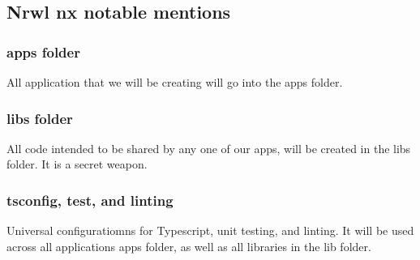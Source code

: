 \subsection{Nrwl nx notable mentions}

\subsubsection{apps folder}
All application that we will be creating will go into the apps folder.

\subsubsection{libs folder}
All code intended to be shared by any one of our apps, will be created in the
libs folder. It is a secret weapon.

\subsubsection{tsconfig, test, and linting}
Universal configuratiomns for Typescript, unit testing, and linting. It will
be used across all applications apps folder, as well as all libraries in the lib
folder.
